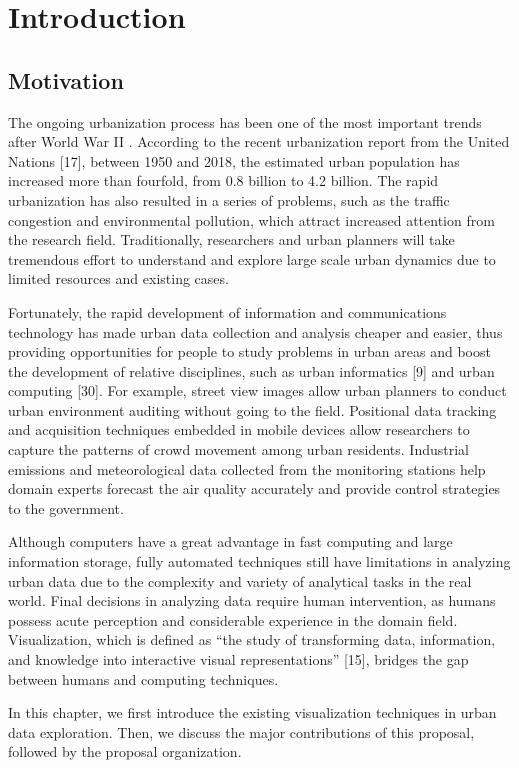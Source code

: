 \chapter{Introduction}\label{chap:intro}

\section{Motivation}
The ongoing urbanization process has been one of the most important trends after World War II . According to the recent urbanization report from the United Nations [17], between 1950 and 2018, the estimated urban population has increased more than fourfold, from 0.8 billion to 4.2 billion. The rapid urbanization has also resulted in a series of problems, such as the traffic congestion and environmental pollution, which attract increased attention from the research field. Traditionally, researchers and urban planners will take tremendous effort to understand and explore large scale urban dynamics due to limited resources and existing cases.

Fortunately, the rapid development of information and communications technology has made urban data collection and analysis cheaper and easier, thus providing opportunities for people to study problems in urban areas and boost the development of relative disciplines, such as urban informatics [9] and urban computing [30]. For example, street view images allow urban planners to conduct urban environment auditing without going to the field. Positional data tracking and acquisition techniques embedded in mobile devices allow researchers to capture the patterns of crowd movement among urban residents. Industrial emissions and meteorological data collected from the monitoring stations help domain experts forecast the air quality accurately and provide control strategies to the government.

Although computers have a great advantage in fast computing and large information storage, fully automated techniques still have limitations in analyzing urban data due to the complexity and variety of analytical tasks in the real world. Final decisions in analyzing data require human intervention, as humans possess acute perception and considerable experience in the domain field. Visualization, which is defined as “the study of transforming data, information, and knowledge into interactive visual representations”  [15], bridges the gap between humans and computing techniques.

In this chapter, we first introduce the existing visualization techniques in urban data exploration. Then, we discuss the major contributions of this proposal, followed by the proposal organization.

